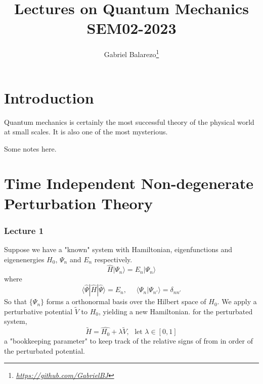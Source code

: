 \documentclass[12pt]{article}
\title{{\Huge Lectures on Quantum Mechanics}\\{\Large{SEM02-2023}}}
\author{Gabriel Balarezo\footnote{\href{https://google.com/}{\textit{https://github.com/GabrielBJ}}}}
\affiliation{Yachay Tech University \\ School of Nanotechnology and Physical Sciences \\ Urcuqui, Ecuador}
\begin{document}
  \maketitle
  \flushbottom
  \newpage
  \pagestyle{fancynotes}
  \part*{Introduction}
Quantum mechanics is certainly the most successful theory of the physical world at small scales. It is also one of the most mysterious.
  
  Some notes here.
\newpage
  \part{Time Independent Non-degenerate Perturbation Theory}

  \section{Lecture 1}
Suppose we have a "known" system with Hamiltonian, eigenfunctions and eigenenergies $\displaystyle{H_0}$,  $\displaystyle{\Psi_n}$ and $\displaystyle{E_n}$ respectively.
  \begin{equation*}
    \hat{H} |\Psi_n \rangle = E_n |\Psi_n \rangle 
\end{equation*}
where
$$\langle \hat{\Psi} |\hat{H}|\hat{\Psi} \rangle = E_n,\,\,\,\,\,\,\,\,
	\langle \Psi_n | \Psi_{n'} \rangle = \delta_{nn'} $$
So that $\{\displaystyle{\Psi_n}\}$ forms a orthonormal basis over the Hilbert space of $\displaystyle{H_0}$. 
We apply a perturbative potential $\tilde{V}$  to $H_0$, yielding a new Hamiltonian. 
for the perturbated system,
\begin{equation}
\label{eq:1}
  \tilde{H} = \hat{H_0} + \lambda \tilde{V},\,\,\,\,\text{let}\,\,\lambda \in [0,1]
\end{equation}
a "bookkeeping parameter" to keep track of the relative signs of from in order of the perturbated 
potential.
\end{document}
